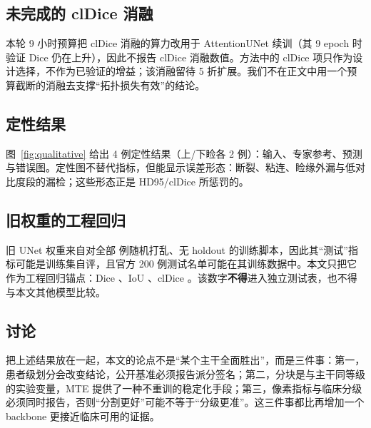 \subsection{未完成的 clDice 消融}

本轮 9 小时预算把 clDice 消融的算力改用于 AttentionUNet 续训（其 9 epoch 时验证 Dice 仍在上升），因此不报告 clDice 消融数值。方法中的 clDice 项只作为设计选择，不作为已验证的增益；该消融留待 5 折扩展。我们不在正文中用一个预算截断的消融去支撑“拓扑损失有效”的结论。

\subsection{定性结果}\label{sec:qualitative}

图~\ref{fig:qualitative} 给出 4 例定性结果（上/下睑各 2 例）：输入、专家参考、预测与错误图。定性图不替代指标，但能显示误差形态：断裂、粘连、睑缘外漏与低对比度段的漏检；这些形态正是 HD95/clDice 所惩罚的。



\subsection{旧权重的工程回归}

旧 UNet 权重来自对全部 \nTotal{} 例随机打乱、无 holdout 的训练脚本，因此其“测试”指标可能是训练集自评，且官方 200 例测试名单可能在其训练数据中。本文只把它作为工程回归锚点：Dice \legacyUNetSelfDice、IoU \legacyUNetSelfIoU、clDice \legacyUNetSelfClDice。该数字\textbf{不得}进入独立测试表，也不得与本文其他模型比较。

\subsection{讨论}

把上述结果放在一起，本文的论点不是“某个主干全面胜出”，而是三件事：第一，患者级划分会改变结论，公开基准必须报告派分签名；第二，分块是与主干同等级的实验变量，MTE 提供了一种不重训的稳定化手段；第三，像素指标与临床分级必须同时报告，否则“分割更好”可能不等于“分级更准”。这三件事都比再增加一个 backbone 更接近临床可用的证据。
